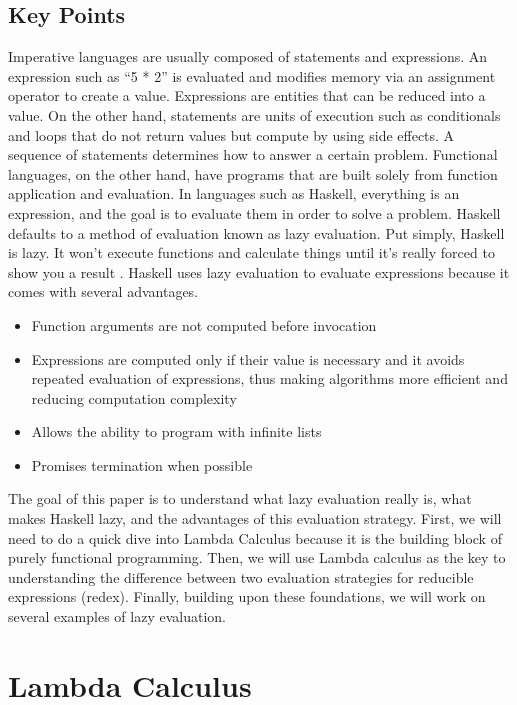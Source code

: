\documentclass{article}
\begin{document}
\subsection{Key Points}

\medskip\noindent
Imperative languages are usually composed of statements and expressions. An expression such as “5 * 2” is evaluated and modifies memory via an assignment operator to create a value. Expressions are entities that can be reduced into a value. On the other hand, statements are units of execution such as conditionals and loops that do not return values but compute by using side effects. A sequence of statements determines how to answer a certain problem. Functional languages, on the other hand, have programs that are built solely from function application and evaluation. In languages such as Haskell, everything is an expression, and the goal is to evaluate them in order to solve a problem. Haskell defaults to a method of evaluation known as lazy evaluation. Put simply, Haskell is lazy. It won’t execute functions and calculate things until it’s really forced to show you a result \cite{LYAH}. Haskell uses lazy evaluation to evaluate expressions because it comes with several advantages. 

\begin{itemize}
    \item Function arguments are not computed before invocation
    \item Expressions are computed only if their value is necessary and it avoids repeated evaluation of expressions, thus making algorithms more efficient and reducing computation complexity
    \item Allows the ability to program with infinite lists
    \item Promises termination when possible  

\end{itemize}

\medskip\noindent
The goal of this paper is to understand what lazy evaluation really is, what makes Haskell lazy, and the advantages of this evaluation strategy. First, we will need to do a quick dive into Lambda Calculus because it is the building block of purely functional programming. Then, we will use Lambda calculus as the key to understanding the difference between two evaluation strategies for reducible expressions (redex). Finally, building upon these foundations, we will work on several examples of lazy evaluation. 

\section{Lambda Calculus}
\end{document}
